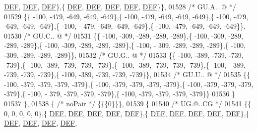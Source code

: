 \begin{DoxyCode}
      \mbox{\hyperlink{1_88_84__epars_8h_a397419fc12b37ed479c8abb9d444d843}{DEF}},  \mbox{\hyperlink{1_88_84__epars_8h_a397419fc12b37ed479c8abb9d444d843}{DEF}},  \mbox{\hyperlink{1_88_84__epars_8h_a397419fc12b37ed479c8abb9d444d843}{DEF}}\},\{  \mbox{\hyperlink{1_88_84__epars_8h_a397419fc12b37ed479c8abb9d444d843}{DEF}},  \mbox{\hyperlink{1_88_84__epars_8h_a397419fc12b37ed479c8abb9d444d843}{DEF}},  \mbox{\hyperlink{1_88_84__epars_8h_a397419fc12b37ed479c8abb9d444d843}{DEF}},  \mbox{\hyperlink{1_88_84__epars_8h_a397419fc12b37ed479c8abb9d444d843}{DEF}},  \mbox{\hyperlink{1_88_84__epars_8h_a397419fc12b37ed479c8abb9d444d843}{DEF}}\}\},
01528 \textcolor{comment}{/* GU.A.. @ */}
01529 \{\{ -100, -479, -649, -649, -649\},\{ -100, -479, -649, -649, -649\},\{ -100, -479, -649, -649, -649\},\{ -100, -
      479, -649, -649, -649\},\{ -100, -479, -649, -649, -649\}\},
01530 \textcolor{comment}{/* GU.C.. @ */}
01531 \{\{ -100, -309, -289, -289, -289\},\{ -100, -309, -289, -289, -289\},\{ -100, -309, -289, -289, -289\},\{ -100, -
      309, -289, -289, -289\},\{ -100, -309, -289, -289, -289\}\},
01532 \textcolor{comment}{/* GU.G.. @ */}
01533 \{\{ -100, -389, -739, -739, -739\},\{ -100, -389, -739, -739, -739\},\{ -100, -389, -739, -739, -739\},\{ -100, -
      389, -739, -739, -739\},\{ -100, -389, -739, -739, -739\}\},
01534 \textcolor{comment}{/* GU.U.. @ */}
01535 \{\{ -100, -379, -379, -379, -379\},\{ -100, -379, -379, -379, -379\},\{ -100, -379, -379, -379, -379\},\{ -100, -
      379, -379, -379, -379\},\{ -100, -379, -379, -379, -379\}\}
01536 \}
01537 \},
01538 \{ \textcolor{comment}{/* noPair */} \{\{\{0\}\}\},
01539 \{
01540 \textcolor{comment}{/* UG.@..CG */}
01541 \{\{    0,    0,    0,    0,    0\},\{  \mbox{\hyperlink{1_88_84__epars_8h_a397419fc12b37ed479c8abb9d444d843}{DEF}},  \mbox{\hyperlink{1_88_84__epars_8h_a397419fc12b37ed479c8abb9d444d843}{DEF}},  \mbox{\hyperlink{1_88_84__epars_8h_a397419fc12b37ed479c8abb9d444d843}{DEF}},  \mbox{\hyperlink{1_88_84__epars_8h_a397419fc12b37ed479c8abb9d444d843}{DEF}},  \mbox{\hyperlink{1_88_84__epars_8h_a397419fc12b37ed479c8abb9d444d843}{DEF}}\},\{  
      \mbox{\hyperlink{1_88_84__epars_8h_a397419fc12b37ed479c8abb9d444d843}{DEF}},  \mbox{\hyperlink{1_88_84__epars_8h_a397419fc12b37ed479c8abb9d444d843}{DEF}},  \mbox{\hyperlink{1_88_84__epars_8h_a397419fc12b37ed479c8abb9d444d843}{DEF}},  \mbox{\hyperlink{1_88_84__epars_8h_a397419fc12b37ed479c8abb9d444d843}{DEF}},  \mbox{\hyperlink{1_88_84__epars_8h_a397419fc12b37ed479c8abb9d444d843}{DEF}}\},\{  \mbox{\hyperlink{1_88_84__epars_8h_a397419fc12b37ed479c8abb9d444d843}{DEF}},  \mbox{\hyperlink{1_88_84__epars_8h_a397419fc12b37ed479c8abb9d444d843}{DEF}},  \mbox{\hyperlink{1_88_84__epars_8h_a397419fc12b37ed479c8abb9d444d843}{DEF}},  \mbox{\hyperlink{1_88_84__epars_8h_a397419fc12b37ed479c8abb9d444d843}{DEF}},  

\end{DoxyCode}

